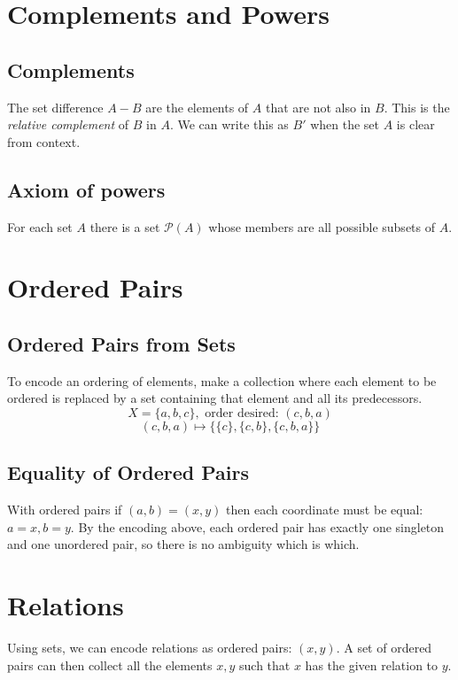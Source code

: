 \documentclass{article}
\begin{document}
\section{Complements and Powers}

\subsection{Complements} The set difference $A - B$ are the elements of $A$ that are not also in $B$. This is the \textit{relative complement} of $B$ in $A$. We can write this as $B'$ when the set $A$ is clear from context.

\subsection{Axiom of powers} For each set $A$ there is a set $\mathcal{P}(A)$ whose members are all possible subsets of $A$. 

\section{Ordered Pairs}

\subsection{Ordered Pairs from Sets} To encode an ordering of elements, make a collection where each element to be ordered is replaced by a set containing that element and all its predecessors.
$$X = \{a, b, c\}, \text{ order desired: } (c, b, a)$$
$$(c, b, a) \longmapsto \{\{c\}, \{c, b\}, \{c, b, a\}\}$$

\subsection{Equality of Ordered Pairs} With ordered pairs if $(a, b) = (x, y)$ then each coordinate must be equal: $a = x, b = y$. By the encoding above, each ordered pair has exactly one singleton and one unordered pair, so there is no ambiguity which is which.

\section{Relations}

Using sets, we can encode relations as ordered pairs: $(x, y)$. A set of ordered pairs can then collect all the elements $x, y$ such that $x$ has the given relation to $y$.
\end{document}
